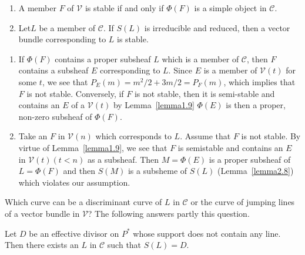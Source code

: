 \begin{lemma}\label{lemma5.1}
\begin{enumerate}
\renewcommand{\labelenumi}{(\theenumi)}
\item A member $F$ of $\mathscr{V}$ is stable if and only if $\Phi(F)$
  is a simple object in $\mathscr{C}$.

\item Let\pageoriginale $L$ be a member of $\mathscr{C}$. If $S(L)$ is
irreducible and reduced, then a vector bundle corresponding to $L$ is
stable. 
\end{enumerate}
\end{lemma}

\begin{Proof}
\begin{enumerate}
\renewcommand{\labelenumi}{(\theenumi)}
\item If $\Phi(F)$ contains a proper subsheaf $L$ which is a member of
  $\mathscr{C}$, then $F$ contains a subsheaf $E$ corresponding to
  $L$. Since $E$ is a member of $\mathscr{V}(t)$ for some $t$, we see
  that $P_E(m)=m^{2}/2+3m/2=P_F(m)$, which implies
  that $F$ is not stable. Conversely, if $F$ is not stable, then it is
  semi-stable and contains an $E$ of a $\mathscr{V}(t)$ by
  Lemma~\ref{lemma1.9} $\Phi(E)$ is then a proper, non-zero subsheaf
  of $\Phi(F)$. 

\item Take an $F$ in $\mathscr{V}(n)$ which corresponds to $L$. Assume
  that $F$ is not stable. By virtue of Lemma~\ref{lemma1.9}, we see
  that $F$ is semistable and contains an $E$ in $\mathscr{V}(t)(t<n)$
  as a subsheaf. Then $M=\Phi(E)$ is a proper subsheaf of $L=\Phi(F)$
  and then $S(M)$ is a subsheme of $S(L)$ (Lemma~\ref{lemma2.8}) which
  violates our assumption. 
\end{enumerate}
\enprf
\end{Proof}

Which curve can be a discriminant curve of $L$ in $\mathscr{C}$ or the
curve of jumping lines of a vector bundle in $\mathscr{V}$? The
following answers partly this question.

\begin{lemma}\label{lemma5.2}
Let $D$ be an effective divisor on $P^{\ast}$ whose support does not
contain any line. Then there exists an $L$ in $\mathscr{C}$ such that
$S(L)=D$. 
\end{lemma}

